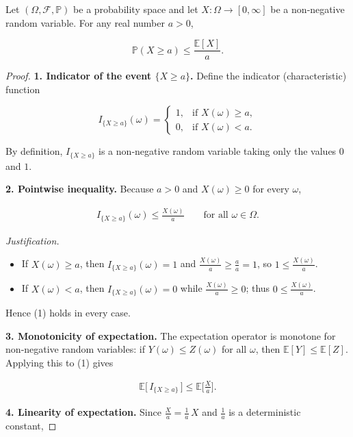 \begin{theorem}
Let \((\Omega,\mathcal{F},\mathbb{P})\) be a probability space and let
\(X:\Omega\to[0,\infty]\) be a non‑negative random variable.
For any real number \(a>0\),

\[
\mathbb{P}(X\ge a)\le\frac{\mathbb{E}[X]}{a}.
\]
\end{theorem}

\begin{proof}
\textbf{1. Indicator of the event \(\{X\ge a\}\).}  
Define the indicator (characteristic) function

\[
I_{\{X\ge a\}}(\omega)=
\begin{cases}
1, &\text{if } X(\omega)\ge a,\\[2mm]
0, &\text{if } X(\omega)< a .
\end{cases}
\]

By definition, \(I_{\{X\ge a\}}\) is a non‑negative random variable taking only the
values \(0\) and \(1\).

\medskip
\textbf{2. Pointwise inequality.}  
Because \(a>0\) and \(X(\omega)\ge0\) for every \(\omega\),

\begin{align*}
I_{\{X\ge a\}}(\omega)\le\frac{X(\omega)}{a}\qquad\text{for all }\omega\in\Omega.
\tag{1}
\end{align*}

\noindent\textit{Justification.}
\begin{itemize}
\item If \(X(\omega)\ge a\), then \(I_{\{X\ge a\}}(\omega)=1\) and
\(\frac{X(\omega)}{a}\ge\frac{a}{a}=1\), so \(1\le\frac{X(\omega)}{a}\).
\item If \(X(\omega)< a\), then \(I_{\{X\ge a\}}(\omega)=0\) while
\(\frac{X(\omega)}{a}\ge0\); thus \(0\le\frac{X(\omega)}{a}\).
\end{itemize}
Hence (1) holds in every case.

\medskip
\textbf{3. Monotonicity of expectation.}  
The expectation operator is monotone for non‑negative random variables:
if \(Y(\omega)\le Z(\omega)\) for all \(\omega\), then \(\mathbb{E}[Y]\le\mathbb{E}[Z]\).
Applying this to (1) gives

\begin{align*}
\mathbb{E}\!\big[\,I_{\{X\ge a\}}\,\big]\le
\mathbb{E}\!\bigg[\frac{X}{a}\bigg].
\tag{2}
\end{align*}

\medskip
\textbf{4. Linearity of expectation.}  
Since \(\frac{X}{a}= \frac{1}{a}\,X\) and \(\frac{1}{a}\) is a deterministic constant,


\end{proof}
